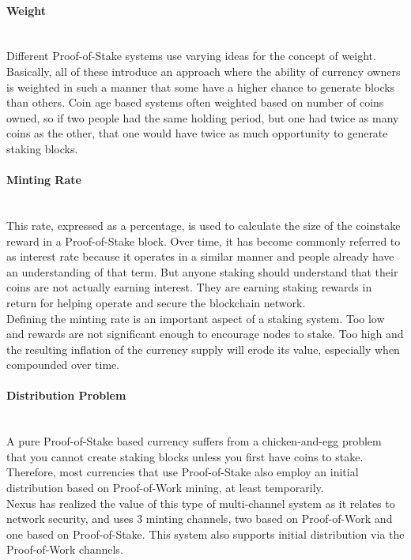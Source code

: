 \documentclass[11pt]{article}
\begin{document}
\paragraph{Weight} ~\\
Different Proof-of-Stake systems use varying ideas for the concept of weight. Basically, all of these introduce an approach where the ability of currency owners is weighted in such a manner that some have a higher chance to generate blocks than others. Coin age based systems often weighted based on number of coins owned, so if two people had the same holding period, but one had twice as many coins as the other, that one would have twice as much opportunity to generate staking blocks.

\paragraph{Minting Rate} ~\\
This rate, expressed as a percentage, is used to calculate the size of the coinstake reward in a Proof-of-Stake block. Over time, it has become commonly referred to as interest rate because it operates in a similar manner and people already have an understanding of that term. But anyone staking should understand that their coins are not actually earning interest. They are earning staking rewards in return for helping operate and secure the blockchain network.\\

\noindent Defining the minting rate is an important aspect of a staking system. Too low and rewards are not significant enough to encourage nodes to stake. Too high and the resulting inflation of the currency supply will erode its value, especially when compounded over time.

\paragraph{Distribution Problem} ~\\
A pure Proof-of-Stake based currency suffers from a chicken-and-egg problem that you cannot create staking blocks unless you first have coins to stake. Therefore, most currencies that use Proof-of-Stake also employ an initial distribution based on Proof-of-Work mining, at least temporarily.\\

\noindent Nexus has realized the value of this type of multi-channel system as it relates to network security, and uses 3 minting channels, two based on Proof-of-Work and one based on Proof-of-Stake. This system also supports initial distribution via the Proof-of-Work channels.
\end{document}
